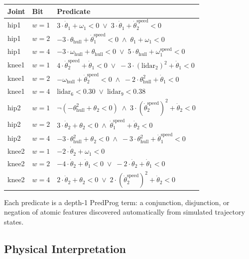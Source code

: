 \documentclass[9pt,a4paper]{article}
\theoremstyle{plain}
\theoremstyle{definition}
\theoremstyle{remark}
\begin{document}
\begin{center}
\small
\begin{tabular}{@{}llp{8cm}@{}}
\toprule
\textbf{Joint} & \textbf{Bit} & \textbf{Predicate} \\
\midrule
hip1 & $w{=}1$ & $3 \cdot \dot\theta_1 + \omega_1 < 0 \;\lor\; 3 \cdot \dot\theta_1 + \dot\theta_2^\text{speed} < 0$ \\
hip1 & $w{=}2$ & $-3 \cdot \theta_\text{hull} + \dot\theta_1^\text{speed} < 0 \;\land\; \theta_1 + \omega_1 < 0$ \\
hip1 & $w{=}4$ & $-3 \cdot \omega_\text{hull} + \theta_\text{hull} < 0 \;\lor\; 5 \cdot \theta_\text{hull} + \omega_1^\text{speed} < 0$ \\
\midrule
knee1 & $w{=}1$ & $4 \cdot \dot\theta_2^\text{speed} + \dot\theta_1 < 0 \;\lor\; -3 \cdot (\text{lidar}_2)^2 + \dot\theta_1 < 0$ \\
knee1 & $w{=}2$ & $-\omega_\text{hull} + \dot\theta_2^\text{speed} < 0 \;\land\; -2 \cdot \theta_\text{hull}^2 + \dot\theta_1 < 0$ \\
knee1 & $w{=}4$ & $\text{lidar}_6 < 0.30 \;\lor\; \text{lidar}_9 < 0.38$ \\
\midrule
hip2 & $w{=}1$ & $\lnot(-\theta_\text{hull}^2 + \theta_2 < 0) \;\land\; 3 \cdot (\dot\theta_2^\text{speed})^2 + \dot\theta_2 < 0$ \\
hip2 & $w{=}2$ & $3 \cdot \dot\theta_2 + \theta_2 < 0 \;\land\; \dot\theta_1^\text{speed} + \dot\theta_2 < 0$ \\
hip2 & $w{=}4$ & $-3 \cdot \theta_\text{hull}^2 + \theta_2 < 0 \;\land\; -3 \cdot \theta_\text{hull}^2 + \dot\theta_1^\text{speed} < 0$ \\
\midrule
knee2 & $w{=}1$ & $-2 \cdot \dot\theta_2 + \omega_1 < 0$ \\
knee2 & $w{=}2$ & $-4 \cdot \dot\theta_2 + \dot\theta_1 < 0 \;\lor\; -2 \cdot \dot\theta_2 + \dot\theta_1 < 0$ \\
knee2 & $w{=}4$ & $2 \cdot \dot\theta_2 + \theta_2 < 0 \;\lor\; 2 \cdot (\dot\theta_2^\text{speed})^2 + \dot\theta_2 < 0$ \\
\bottomrule
\end{tabular}
\end{center}

Each predicate is a depth-1 PredProg term: a conjunction, disjunction,
or negation of atomic features discovered automatically from
simulated trajectory states.

\subsection{Physical Interpretation}
\end{document}
